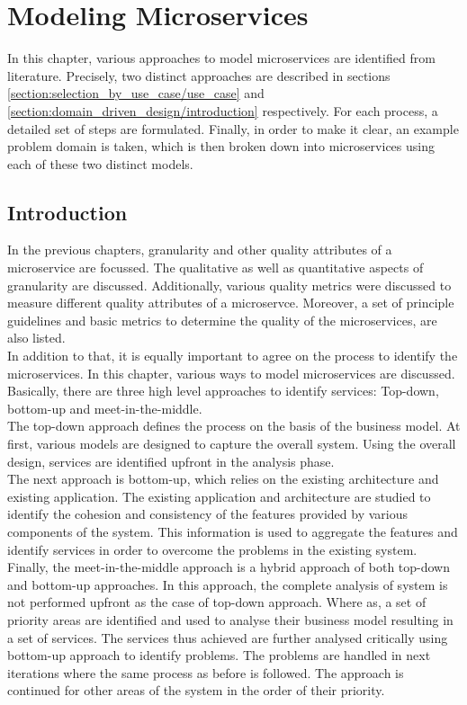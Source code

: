 \chapter{Modeling Microservices}\label{chapter:service_candidate}
In this chapter, various approaches to model microservices are identified from literature. Precisely, two distinct approaches are described in sections \ref{section:selection_by_use_case/use_case} and \ref{section:domain_driven_design/introduction} respectively. For each process, a detailed set of steps are formulated. Finally, in order to make it clear, an example problem domain is taken, which is then broken down into microservices using each of these two distinct models.
\section{Introduction}\label{section:service_candidate/introduction}
In the previous chapters, granularity and other quality attributes of a microservice are focussed. The qualitative as well as quantitative aspects of granularity are discussed. Additionally, various quality metrics were discussed to measure different quality attributes of a microservce. Moreover, a set of principle guidelines and basic metrics to determine the quality of the microservices, are also listed.\\
In addition to that, it is equally important to agree on the process to identify the microservices. In this chapter, various ways to model microservices are discussed.
Basically, there are three high level approaches to identify services: Top-down, bottom-up and meet-in-the-middle. \\
The top-down approach defines the process on the basis of the business model. At first, various models are designed to capture the overall system. Using the overall design, services are identified upfront in the analysis phase.\\
The next approach is bottom-up, which relies on the existing architecture and existing application. The existing application and architecture are studied to identify the cohesion and consistency of the features provided by various components of the system. This information is used to aggregate the features and identify services in order to overcome the problems in the existing system.\\
Finally, the meet-in-the-middle approach is a hybrid approach of both top-down and bottom-up approaches. In this approach, the complete analysis of system is not performed upfront as the case of top-down approach. Where as, a set of priority areas are identified and used to analyse their business model resulting in a set of services. The services thus achieved are further analysed critically using bottom-up approach to identify problems. The problems are handled in next iterations where the same process as before is followed. The approach is continued for other areas of the system in the order of their priority. \cite{Pierre-Reldin:2007aa}\cite{Arsanjani:2004aa}\\
